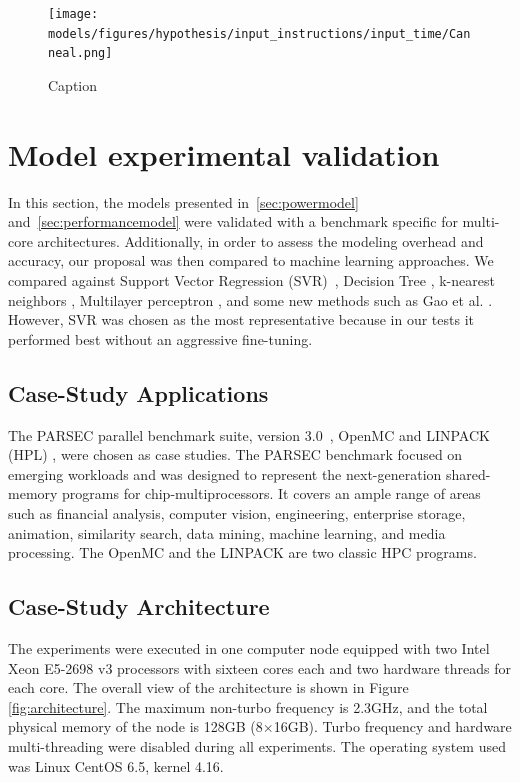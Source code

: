 \begin{figure}[H]
	\centering
	\texttt{[image: models/figures/hypothesis/input\_instructions/input\_time/Canneal.png]}
	\caption{Caption}
	\label{fig:my_label}
\end{figure}

\section{Model experimental validation} \label{sec:experimentalvalidation}
In this section, the models presented in~\cref{sec:powermodel} and~\cref{sec:performancemodel} were validated with a benchmark specific for multi-core architectures. Additionally, in order to assess the modeling overhead and accuracy, our proposal was then compared to machine learning approaches. We compared against Support Vector Regression (SVR)~\cite{Smola2004}, Decision Tree \cite{Kitts2006RegressionLecture}, k-nearest neighbors \cite{Altman1992AnRegression}, Multilayer perceptron \cite{Murtagh1991MultilayerRegression}, and some new methods such as Gao et al. \cite{Gao2019DendriticPrediction}. However, SVR was chosen as the most representative because in our tests it performed best without an aggressive fine-tuning.

\subsection{Case-Study Applications} \label{sec:casestudyapplication}
The PARSEC parallel benchmark suite, version 3.0~\cite{Bienia2008}, OpenMC \cite{Romano2015OpenMC:Development} and LINPACK (HPL) \cite{Dongarra1988TheExplanation}, were chosen as case studies. The PARSEC benchmark focused on emerging workloads and was designed to represent the next-generation shared-memory programs for chip-multiprocessors. It covers an ample range of areas such as financial analysis, computer vision, engineering, enterprise storage, animation, similarity search, data mining, machine learning, and media processing. The OpenMC and the LINPACK are two classic HPC programs.

\subsection{Case-Study Architecture} \label{sec:casestudyarchitecture}
The experiments were executed in one computer node equipped with two Intel Xeon E5-2698 v3 processors with sixteen cores each and two hardware threads for each core. The overall view of the architecture is shown in Figure \ref{fig:architecture}. The maximum non-turbo frequency is 2.3GHz, and the total physical memory of the node is 128GB (8$\times$16GB). Turbo frequency and hardware multi-threading were disabled during all experiments. The operating system used was Linux CentOS 6.5, kernel 4.16. 

